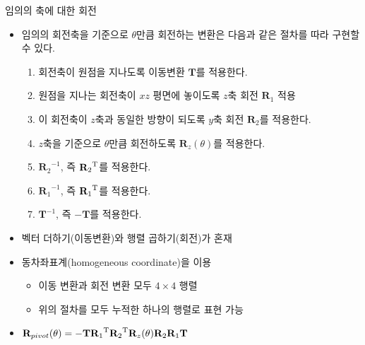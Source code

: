 \begin{frame}{임의의 축에 대한 회전}

\begin{itemize}
\item 임의의 회전축을 기준으로  $\theta$만큼 회전하는 변환은 다음과 같은 절차를 따라 구현할 수 있다.

	\begin{enumerate}
	\item 회전축이 원점을 지나도록 이동변환 $\mathbf T$를 적용한다.
	\item 원점을 지나는 회전축이 $xz$ 평면에 놓이도록 $z$축 회전 $\mathbf R_1$ 적용
	\item 이 회전축이 $z$축과 동일한 방향이 되도록 $y$축 회전 $\mathbf R_2$를 적용한다.
	\item $z$축을 기준으로 $\theta$만큼 회전하도록 $\mathbf R_z(\theta)$를 적용한다.
	\item ${\mathbf R_2}^{-1}$, 즉 ${\mathbf R_2}^{\rm T}$를 적용한다.
	\item ${\mathbf R_1}^{-1}$, 즉 ${\mathbf R_1}^{\rm T}$를 적용한다.
	\item $\mathbf T^{-1}$, 즉 $- \mathbf T$를 적용한다.
	\end{enumerate}

\item 벡터 더하기(이동변환)와 행렬 곱하기(회전)가 혼재
\item 동차좌표계(homogeneous coordinate)을 이용
	\begin{itemize}
	\item 이동 변환과 회전 변환 모두 $4 \times 4$ 행렬
	\item 위의 절차를 모두 누적한 하나의 행렬로 표현 가능
	\end{itemize}
\item $\mathbf R_{pivot}(\theta) = - \mathbf T {\mathbf R_1}^{\rm T} {\mathbf R_2}^{\rm T}  \mathbf R_z(\theta) \mathbf R_2  \mathbf R_1 \mathbf T $
\end{itemize}


\end{frame}


